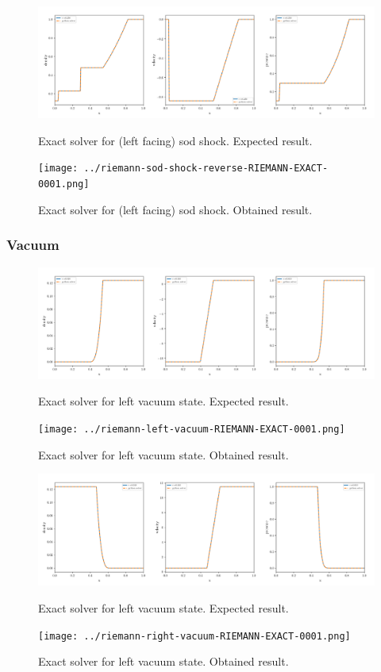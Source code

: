 \begin{figure}[htbp]
    \centering
	\includegraphics[width=.9\textwidth]{./figures/riemann-sod-shock-reverse-RIEMANN-EXACT-overplotted.png}%
	\caption{Exact solver for (left facing) sod shock. Expected result.}
	\texttt{[image: ../riemann-sod-shock-reverse-RIEMANN-EXACT-0001.png]}%
	\caption{Exact solver for (left facing) sod shock. Obtained result.}
\end{figure}












\clearpage
\subsubsection{Vacuum}


\begin{figure}[htbp]
    \centering
	\includegraphics[width=.9\textwidth]{./figures/riemann-left-vacuum-RIEMANN-EXACT-overplotted.png}%
	\caption{Exact solver for left vacuum state. Expected result.}
	\texttt{[image: ../riemann-left-vacuum-RIEMANN-EXACT-0001.png]}
	\caption{Exact solver for left vacuum state. Obtained result.}
\end{figure}


\begin{figure}[htbp]
    \centering
	\includegraphics[width=.9\textwidth]{./figures/riemann-right-vacuum-RIEMANN-EXACT-overplotted.png}%
	\caption{Exact solver for left vacuum state. Expected result.}
	\texttt{[image: ../riemann-right-vacuum-RIEMANN-EXACT-0001.png]}
	\caption{Exact solver for left vacuum state. Obtained result.}
\end{figure}


